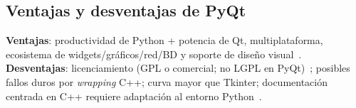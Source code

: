 \subsection{Ventajas y desventajas de PyQt}
\textbf{Ventajas}: productividad de Python + potencia de Qt, multiplataforma, ecosistema de widgets/gráficos/red/BD y soporte de diseño visual~\cite{ontosight_pyqt_basics, tutorialspoint_pyqt, lemberg}. \\
\textbf{Desventajas}: licenciamiento (GPL o comercial; no LGPL en PyQt)~\cite{pyqt_wiki}; posibles fallos duros por \emph{wrapping} C++; curva mayor que Tkinter; documentación centrada en C++ requiere adaptación al entorno Python~\cite{gfg_pyqt_vs_tkinter, itsupplychain}.
